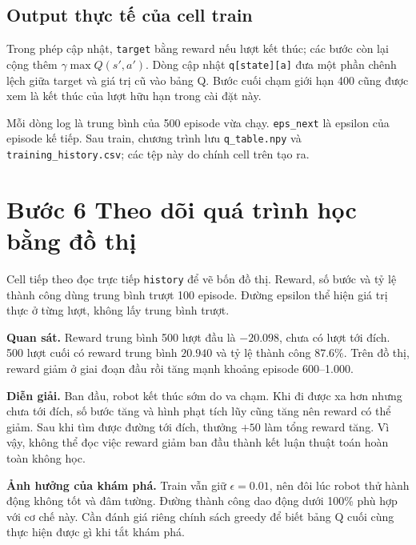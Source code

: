 
\clearpage
\subsection{Output thực tế của cell train}

Trong phép cập nhật, \texttt{target} bằng reward nếu lượt kết thúc; các bước còn lại cộng thêm $\gamma\max Q(s',a')$. Dòng cập nhật \texttt{q[state][a]} đưa một phần chênh lệch giữa target và giá trị cũ vào bảng Q. Bước cuối chạm giới hạn 400 cũng được xem là kết thúc của lượt hữu hạn trong cài đặt này.

Mỗi dòng log là trung bình của 500 episode vừa chạy. \texttt{eps\_next} là epsilon của episode kế tiếp. Sau train, chương trình lưu \texttt{q\_table.npy} và \texttt{training\_history.csv}; các tệp này do chính cell trên tạo ra.

\clearpage
\section{Bước 6 Theo dõi quá trình học bằng đồ thị}
Cell tiếp theo đọc trực tiếp \texttt{history} để vẽ bốn đồ thị. Reward, số bước và tỷ lệ thành công dùng trung bình trượt 100 episode. Đường epsilon thể hiện giá trị thực ở từng lượt, không lấy trung bình trượt.



\textbf{Quan sát.} Reward trung bình 500 lượt đầu là $-20.098$, chưa có lượt tới đích. 500 lượt cuối có reward trung bình $20.940$ và tỷ lệ thành công $87.6\%$. Trên đồ thị, reward giảm ở giai đoạn đầu rồi tăng mạnh khoảng episode 600--1.000.

\textbf{Diễn giải.} Ban đầu, robot kết thúc sớm do va chạm. Khi đi được xa hơn nhưng chưa tới đích, số bước tăng và hình phạt tích lũy cũng tăng nên reward có thể giảm. Sau khi tìm được đường tới đích, thưởng $+50$ làm tổng reward tăng. Vì vậy, không thể đọc việc reward giảm ban đầu thành kết luận thuật toán hoàn toàn không học.

\textbf{Ảnh hưởng của khám phá.} Train vẫn giữ $\epsilon=0.01$, nên đôi lúc robot thử hành động không tốt và đâm tường. Đường thành công dao động dưới 100\% phù hợp với cơ chế này. Cần đánh giá riêng chính sách greedy để biết bảng Q cuối cùng thực hiện được gì khi tắt khám phá.

